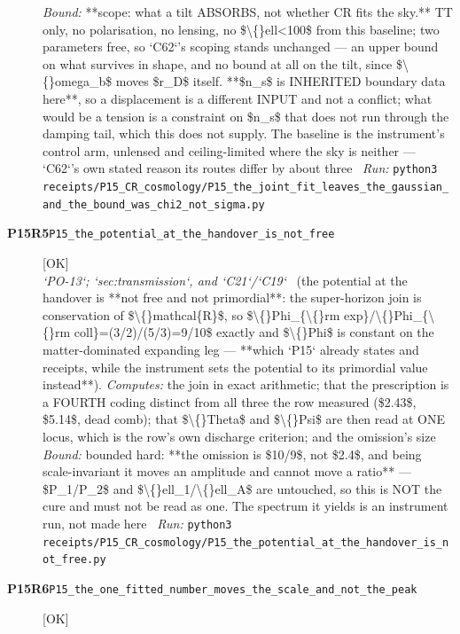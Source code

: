 \begin{description}
 \emph{Bound:} **scope: what a tilt ABSORBS, not whether CR fits the sky.** TT only, no polarisation, no lensing, no \$\textbackslash\{\}ell<100\$ from this baseline; two parameters free, so `C62`'s scoping stands unchanged --- an upper bound on what survives in shape, and no bound at all on the tilt, since \$\textbackslash\{\}omega\_b\$ moves \$r\_D\$ itself.  **\$n\_s\$ is INHERITED boundary data here**, so a displacement is a different INPUT and not a conflict; what would be a tension is a constraint on \$n\_s\$ that does not run through the damping tail, which this does not supply. The baseline is the instrument's control arm, unlensed and ceiling-limited where the sky is neither --- `C62`'s own stated reason its routes differ by about three
\ \emph{Run:} \texttt{python3 receipts/P15\_CR\_cosmology/P15\_the\_joint\_fit\_leaves\_the\_gaussian\_and\_the\_bound\_was\_chi2\_not\_sigma.py}
\item[\rcptlabel{P15_the_potential_at_the_handover_is_not_free}{P15R5}\textbf{P15R5}\quad\texttt{P15\_the\_potential\_at\_the\_handover\_is\_not\_free}]\hfill\textsf{[OK]}\\
\textit{`PO-13`; `sec:transmission`, and `C21`/`C19`} \ (the potential at the handover is **not free and not primordial**: the super-horizon join is conservation of \$\textbackslash\{\}mathcal\{R\}\$, so \$\textbackslash\{\}Phi\_\{\textbackslash\{\}rm exp\}/\textbackslash\{\}Phi\_\{\textbackslash\{\}rm coll\}=(3/2)/(5/3)=9/10\$ exactly and \$\textbackslash\{\}Phi\$ is constant on the matter-dominated expanding leg --- **which `P15` already states and receipts, while the instrument sets the potential to its primordial value instead**). 
\emph{Computes:} the join in exact arithmetic; that the prescription is a FOURTH coding distinct from all three the row measured (\$2.43\$, \$5.14\$, dead comb); that \$\textbackslash\{\}Theta\$ and \$\textbackslash\{\}Psi\$ are then read at ONE locus, which is the row's own discharge criterion; and the omission's size
 \emph{Bound:} bounded hard: **the omission is \$10/9\$, not \$2.4\$, and being scale-invariant it moves an amplitude and cannot move a ratio** --- \$P\_1/P\_2\$ and \$\textbackslash\{\}ell\_1/\textbackslash\{\}ell\_A\$ are untouched, so this is NOT the cure and must not be read as one. The spectrum it yields is an instrument run, not made here
\ \emph{Run:} \texttt{python3 receipts/P15\_CR\_cosmology/P15\_the\_potential\_at\_the\_handover\_is\_not\_free.py}
\item[\rcptlabel{P15_the_one_fitted_number_moves_the_scale_and_not_the_peak}{P15R6}\textbf{P15R6}\quad\texttt{P15\_the\_one\_fitted\_number\_moves\_the\_scale\_and\_not\_the\_peak}]\hfill\textsf{[OK]}\\

\end{description}
